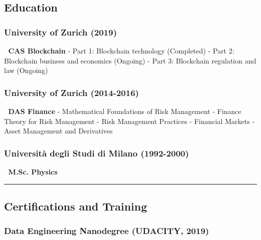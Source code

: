 \subsection{Education}\label{education}

\subsubsection{\texorpdfstring{\textbf{University of Zurich}
(2019)}{University of Zurich (2019)}}\label{university-of-zurich-2019}

🔹 \textbf{CAS Blockchain} - Part 1: Blockchain technology (Completed) -
Part 2: Blockchain business and economics (Ongoing) - Part 3: Blockchain
regulation and law (Ongoing)

\subsubsection{\texorpdfstring{\textbf{University of Zurich}
(2014-2016)}{University of Zurich (2014-2016)}}\label{university-of-zurich-2014-2016}

🔹 \textbf{DAS Finance} - Mathematical Foundations of Risk Management -
Finance Theory for Risk Management - Risk Management Practices -
Financial Markets - Asset Management and Derivatives

\subsubsection{\texorpdfstring{\textbf{Università degli Studi di Milano}
(1992-2000)}{Università degli Studi di Milano (1992-2000)}}\label{universituxe0-degli-studi-di-milano-1992-2000}

🔹 \textbf{M.Sc. Physics}

\begin{center}\rule{0.5\linewidth}{0.5pt}\end{center}

\subsection{Certifications and
Training}\label{certifications-and-training}

\subsubsection{\texorpdfstring{\textbf{Data Engineering Nanodegree}
(UDACITY,
2019)}{Data Engineering Nanodegree (UDACITY, 2019)}}\label{data-engineering-nanodegree-udacity-2019}

